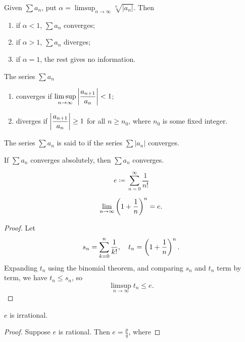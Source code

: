 \begin{lemma}
Given $\sum a_n$, put $\displaystyle\alpha=\limsup_{n\to\infty}\sqrt[n]{|a_n|}$. Then
\begin{enumerate}[label=(\roman*)]
\item if $\alpha<1$, $\sum a_n$ converges;
\item if $\alpha>1$, $\sum a_n$ diverges;
\item if $\alpha=1$, the rest gives no information.
\end{enumerate}
\end{lemma}

\begin{lemma}
The series $\sum a_n$
\begin{enumerate}[label=(\roman*)]
\item converges if $\displaystyle\limsup_{n\to\infty}\left|\frac{a_{n+1}}{a_n}\right|<1$;
\item diverges if $\displaystyle\left|\frac{a_{n+1}}{a_n}\right|\ge1$ for all $n\ge n_0$, where $n_0$ is some fixed integer.
\end{enumerate}
\end{lemma}

The series $\sum a_n$ is said to  if the series $\sum|a_n|$ converges.

\begin{lemma}
If $\sum a_n$ converges absolutely, then $\sum a_n$ converges.
\end{lemma}

\begin{definition}
\[e\coloneqq\sum_{n=0}^\infty\frac{1}{n!}\]
\end{definition}

\begin{lemma}
\[\lim_{n\to\infty}\left(1+\frac{1}{n}\right)^n=e.\]
\end{lemma}

\begin{proof}
Let
\[s_n=\sum_{k=0}^n\frac{1}{k!},\quad t_n=\left(1+\frac{1}{n}\right)^n.\]
Expanding $t_n$ using the binomial theorem, and comparing $s_n$ and $t_n$ term by term, we have $t_n\le s_n$, so
\[\limsup_{n\to\infty}t_n\le e.\]

\end{proof}

\begin{proposition}
$e$ is irrational.
\end{proposition}

\begin{proof}
Suppose $e$ is rational. Then $e=\frac{p}{q}$, where 
\end{proof}